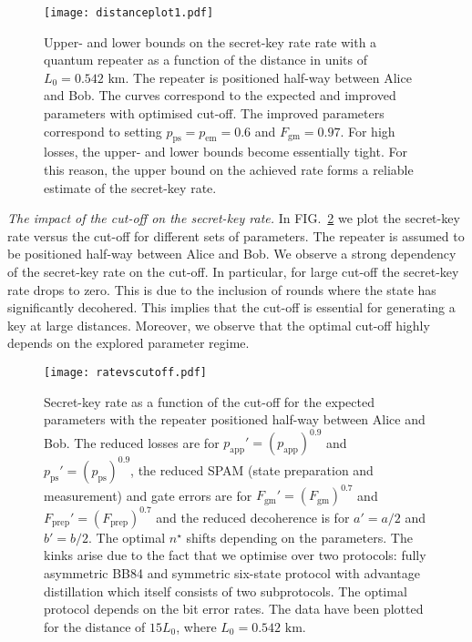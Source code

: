 \documentclass[aps,pra,reprint,superscriptaddress]{revtex4-1}
\newcommand{\nstar}{n^{\star}}
\begin{document}
\begin{figure}
\centering
\texttt{[image: distanceplot1.pdf]}
\caption{Upper- and lower bounds on the secret-key rate rate with a quantum repeater as a function of the distance in units of $L_0 = 0.542 \text{ km}$. The repeater is positioned half-way between Alice and Bob. The curves correspond to the expected and improved parameters with optimised cut-off. The improved parameters correspond to setting $p_{\textrm{ps}} = p_{\textrm{em}} = 0.6$ and $F_{\textrm{gm}} = 0.97$. For high losses, the upper- and lower bounds become essentially tight. For this reason, the upper bound on the achieved rate forms a reliable estimate of the secret-key rate.}
\label{fig:distanceplot1}
\end{figure}


\smallskip
\textit{The impact of the cut-off on the secret-key rate.} In FIG.~\ref{fig:plot1} we plot the secret-key rate versus the cut-off for different sets of parameters. The repeater is assumed to be positioned half-way between Alice and Bob. We observe a strong dependency of the secret-key rate on the cut-off. In particular, for large cut-off the secret-key rate drops to zero. 
This is due to the inclusion of rounds where the state has significantly decohered. This implies that the cut-off is essential for generating a key at large distances. Moreover, we observe that the optimal cut-off highly depends on the explored parameter regime. 
\begin{figure}[h]
\centering
\texttt{[image: ratevscutoff.pdf]}
\caption{Secret-key rate as a function of the cut-off for the expected parameters with the repeater positioned half-way between Alice and Bob. The reduced losses are for $p_{\textrm{app}}' = (p_{\textrm{app}})^{0.9}$ and $p_{\textrm{ps}}' = (p_{\textrm{ps}})^{0.9}$, the reduced SPAM (state preparation and measurement) and gate errors are for $F_{\textrm{gm}}' = (F_{\textrm{gm}})^{0.7}$ and $F_{\textrm{prep}}' = (F_{\textrm{prep}})^{0.7}$ and the reduced decoherence is for $a' = a/2$ and $b'=b/2$. The optimal $\nstar$ shifts depending on the parameters. The kinks arise due to the fact that we optimise over two protocols: fully asymmetric BB84 and symmetric six-state protocol with advantage distillation which itself consists of two subprotocols. The optimal protocol depends on the bit error rates. The data have been plotted for the distance of $15L_0$, where $L_0= 0.542 \text{ km}$.
}
\label{fig:plot1}
\end{figure}
\end{document}
